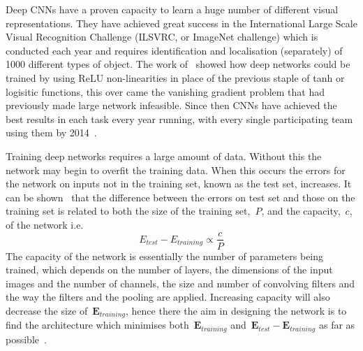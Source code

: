 \documentclass[11pt]{article} %
\begin{document}
Deep CNNs have a proven capacity to learn a huge number of different visual representations. They have achieved great success in the International Large Scale Visual Recognition Challenge (ILSVRC, or ImageNet challenge) which is conducted each year and requires identification and localisation (separately) of 1000 different types of object. The work of~\cite{Krizhevsky2012} showed how deep networks could be trained by using ReLU non-linearities in place of the previous staple of tanh or logisitic functions, this over came the vanishing gradient problem that had previously made large network infeasible. Since then CNNs have achieved the best results in each task every year running, with every single participating team using them by 2014~\cite{Russakovsky}.

Training deep networks requires a large amount of data. Without this the network may begin to overfit the training data. When this occurs the errors for the network on inputs not in the training set, known as the test set, increases. It can be shown~\cite{Seung1992,Vapnik1994} that the difference between the errors on test set and those on the training set is related to both the size of the training set,~$P$, and the capacity,~$c$,  of the network i.e. 
\begin{equation}
E_{test}-E_{training} \propto \frac{c}{P}
\label{eq:errorCap}
\end{equation}
The capacity of the network is essentially the number of parameters being trained, which depends on the number of layers, the dimensions of the input images and the number of channels, the size and number of convolving filters and the way the filters and the pooling are applied. Increasing capacity will also decrease the size of~$\boldsymbol{E}_{training}$, hence there the aim in designing the network is to find the architecture which minimises both~$\boldsymbol{E}_{training}$ and~$\boldsymbol{E}_{test}-\boldsymbol{E}_{training}$ as far as possible~\cite{LeCun1998}.
\end{document}
